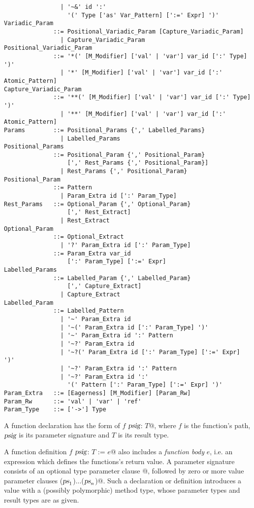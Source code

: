 \begin{lstlisting}
                | '~&' id ':' 
                  '(' Type ['as' Var_Pattern] [':=' Expr] ')'
Variadic_Param 
              ::= Positional_Variadic_Param [Capture_Variadic_Param]
                | Capture_Variadic_Param
Positional_Variadic_Param
              ::= '*(' [M_Modifier] ['val' | 'var'] var_id [':' Type] ')'
                | '*' [M_Modifier] ['val' | 'var'] var_id [':' Atomic_Pattern]
Capture_Variadic_Param
              ::= '**(' [M_Modifier] ['val' | 'var'] var_id [':' Type] ')'
                | '**' [M_Modifier] ['val' | 'var'] var_id [':' Atomic_Pattern]
Params        ::= Positional_Params {',' Labelled_Params}
                | Labelled_Params
Positional_Params
              ::= Positional_Param {',' Positional_Param}
                  [',' Rest_Params {',' Positional_Param}]
                | Rest_Params {',' Positional_Param}
Positional_Param
              ::= Pattern
                | Param_Extra id [':' Param_Type]
Rest_Params   ::= Optional_Param {',' Optional_Param}
                  [',' Rest_Extract]
                | Rest_Extract
Optional_Param 
              ::= Optional_Extract
                | '?' Param_Extra id [':' Param_Type]
              ::= Param_Extra var_id
                  [':' Param_Type] [':=' Expr]
Labelled_Params 
              ::= Labelled_Param {',' Labelled_Param}
                  [',' Capture_Extract]
                | Capture_Extract
Labelled_Param 
              ::= Labelled_Pattern
                | '~' Param_Extra id 
                | '~(' Param_Extra id [':' Param_Type] ')'
                | '~' Param_Extra id ':' Pattern
                | '~?' Param_Extra id
                | '~?(' Param_Extra id [':' Param_Type] [':=' Expr] ')'
                | '~?' Param_Extra id ':' Pattern
                | '~?' Param_Extra id ':' 
                  '(' Pattern [':' Param_Type] [':=' Expr] ')'
Param_Extra   ::= [Eagerness] [M_Modifier] [Param_Rw]
Param_Rw      ::= 'val' | 'var' | 'ref'
Param_Type    ::= ['->'] Type
\end{lstlisting}

A function declaration has the form of \lstinline@def $f$ $\mbox{\sl psig}$: $T$@, where $f$ is the function's path, $\mbox{\sl psig}$ is its parameter signature and $T$ is its result type. 

A function definition \lstinline@def $f$ $\mbox{\sl psig}$: $T$ := $e$@ also includes a {\em function body} $e$, i.e. an expression which defines the functions's return value. A parameter signature consists of an optional type parameter clause \lstinline@[$\tps$]@, followed by zero or more value parameter clauses \lstinline@($\mbox{\sl ps}_1$)$\ldots$($\mbox{\sl ps}_n$)@. Such a declaration or definition introduces a value with a (possibly polymorphic) method type, whose parameter types and result types are as given. 

